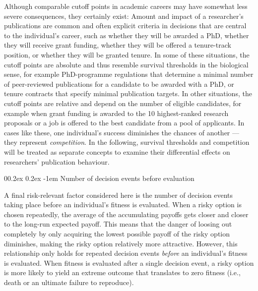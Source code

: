\documentclass[
  ,man,mask,floatsintext]{apa6}
\makeatletter
\let\oldparagraph\paragraph
\renewcommand{\paragraph}[1]{\oldparagraph{#1}\mbox{}}
\renewcommand{\paragraph}{\@startsection{paragraph}{4}{\parindent}%
  {0\baselineskip \@plus 0.2ex \@minus 0.2ex}%
  {-1em}%
  {\normalfont\normalsize\bfseries\itshape\typesectitle}}
\makeatother
\begin{document}
Although comparable cutoff points in academic careers may have somewhat less severe consequences, they certainly exist:
Amount and impact of a researcher's publications are common and often explicit criteria in decisions that are central to the individual's career, such as whether they will be awarded a PhD, whether they will receive grant funding, whether they will be offered a tenure-track position, or whether they will be granted tenure.
In some of these situations, the cutoff points are absolute and thus resemble survival thresholds in the biological sense, for example PhD-programme regulations that determine a minimal number of peer-reviewed publications for a candidate to be awarded with a PhD, or tenure contracts that specify minimal publication targets.
In other situations, the cutoff points are relative and depend on the number of eligible candidates, for example when grant funding is awarded to the 10 highest-ranked research proposals or a job is offered to the best candidate from a pool of applicants.
In cases like these, one individual's success diminishes the chances of another --- they represent \emph{competition}.
In the following, survival thresholds and competition will be treated as separate concepts to examine their differential effects on researchers' publication behaviour.

\hypertarget{number-of-decision-events-before-evaluation}{%
\paragraph{Number of decision events before evaluation}\label{number-of-decision-events-before-evaluation}}

A final risk-relevant factor considered here is the number of decision events taking place before an individual's fitness is evaluated.
When a risky option is chosen repeatedly, the average of the accumulating payoffs gets closer and closer to the long-run expected payoff.
This means that the danger of loosing out completely by only acquiring the lowest possible payoff of the risky option diminishes, making the risky option relatively more attractive.
However, this relationship only holds for repeated decision events \emph{before} an individual's fitness is evaluated.
When fitness is evaluated after a single decision event, a risky option is more likely to yield an extreme outcome that translates to zero fitness (i.e., death or an ultimate failure to reproduce).
\end{document}
